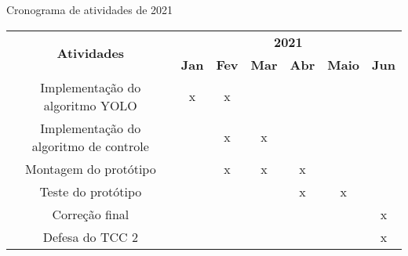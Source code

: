 \begin{quadro}[!ht]
\centering
\caption{\label{qua:cronograma2021}Cronograma de atividades de 2021}

\begin{tabular}{|c|l|c|l|l|l|l|}
\hline
\multirow{2}{*}{\textbf{Atividades}}   & \multicolumn{6}{c|}{\textbf{2021}}                                                                                                                                                                         \\ \cline{2-7} 
                                       & \multicolumn{1}{c|}{\textbf{Jan}} & \textbf{Fev}          & \multicolumn{1}{c|}{\textbf{Mar}} & \multicolumn{1}{c|}{\textbf{Abr}} & \multicolumn{1}{c|}{\textbf{Maio}} & \multicolumn{1}{c|}{\textbf{Jun}} \\ \hline
Implementação do algoritmo YOLO        & \multicolumn{1}{c|}{x}            & x                     &                                   &                                   &                                    &                                   \\ \hline
Implementação do algoritmo de controle &                                   & x                     & \multicolumn{1}{c|}{x}            &                                   &                                    &                                   \\ \hline
Montagem do protótipo                  &                                   & x                     & \multicolumn{1}{c|}{x}            & \multicolumn{1}{c|}{x}            &                                    &                                   \\ \hline
Teste do protótipo                     &                                   & \multicolumn{1}{l|}{} &                                   & \multicolumn{1}{c|}{x}            & \multicolumn{1}{c|}{x}             &                                   \\ \hline
Correção final                         &                                   & \multicolumn{1}{l|}{} &                                   &                                   &                                    & \multicolumn{1}{c|}{x}            \\ \hline
Defesa do TCC 2                        &                                   & \multicolumn{1}{l|}{} &                                   &                                   &                                    & \multicolumn{1}{c|}{x}            \\ \hline
\end{tabular}

\end{quadro}



%

